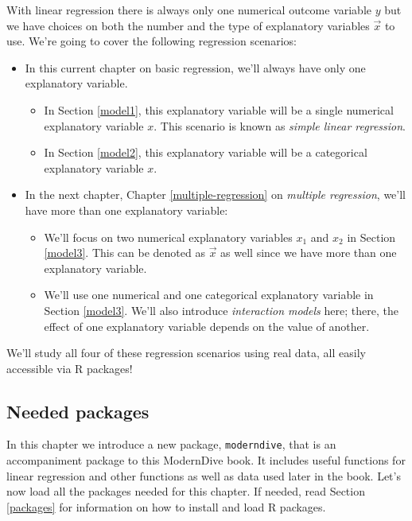 \documentclass[12pt,]{krantz}
\providecommand{\tightlist}{%
  \setlength{\itemsep}{0pt}\setlength{\parskip}{0pt}}
\begin{document}
With linear regression there is always only one numerical outcome
variable \(y\) but we have choices on both the number and the type of
explanatory variables \(\vec{x}\) to use. We're going to cover the
following regression scenarios:

\begin{itemize}
\tightlist
\item
  In this current chapter on basic regression, we'll always have only
  one explanatory variable.

  \begin{itemize}
  \tightlist
  \item
    In Section \ref{model1}, this explanatory variable will be a single
    numerical explanatory variable \(x\). This scenario is known as
    \emph{simple linear regression}.
  \item
    In Section \ref{model2}, this explanatory variable will be a
    categorical explanatory variable \(x\).
  \end{itemize}
\item
  In the next chapter, Chapter \ref{multiple-regression} on
  \emph{multiple regression}, we'll have more than one explanatory
  variable:

  \begin{itemize}
  \tightlist
  \item
    We'll focus on two numerical explanatory variables \(x_1\) and
    \(x_2\) in Section \ref{model3}. This can be denoted as \(\vec{x}\)
    as well since we have more than one explanatory variable.
  \item
    We'll use one numerical and one categorical explanatory variable in
    Section \ref{model3}. We'll also introduce \emph{interaction models}
    here; there, the effect of one explanatory variable depends on the
    value of another.
  \end{itemize}
\end{itemize}

We'll study all four of these regression scenarios using real data, all
easily accessible via R packages!

\subsection*{Needed packages}\label{needed-packages-3}


In this chapter we introduce a new package, \texttt{moderndive}, that is
an accompaniment package to this ModernDive book. It includes useful
functions for linear regression and other functions as well as data used
later in the book. Let's now load all the packages needed for this
chapter. If needed, read Section \ref{packages} for information on how
to install and load R packages.
\end{document}
